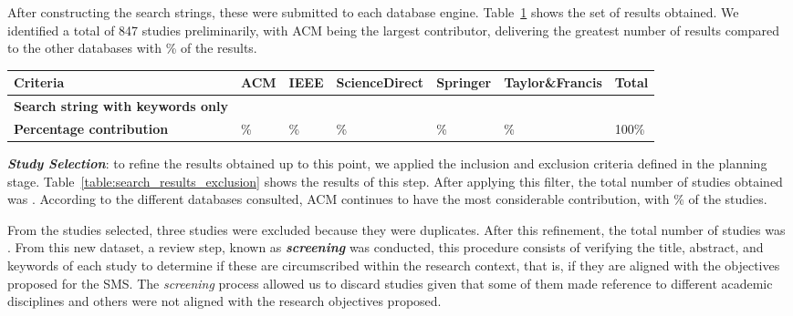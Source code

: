 After constructing the search strings, these were submitted to each database engine. Table~\ref{table:search_results} shows the set of results obtained. We identified a total of 847 studies preliminarily, with ACM being the largest contributor, delivering the greatest number of results compared to the other databases with \acmp\% of the results.

\begin{table}
	{\begin{tabular}{p{3.0cm}p{1.0cm}p{1.0cm}p{2.0cm}p{1.5cm}p{2.5cm}p{1.0cm}} \toprule
			\textbf{Criteria}                         & \textbf{ACM} & \textbf{IEEE} & \textbf{ScienceDirect} & \textbf{Springer} & \textbf{Taylor\&Francis} & \textbf{Total} \\
			\midrule
			\textbf{Search string with keywords only} & \acm{}       & \ieee{}       & \sd{}                  & \spr{}            & \tf{}                    & \tot{}         \\
			\textbf{Percentage contribution}          & \acmp{}\%    & \ieeep{}\%    & \sdp{}\%               & \sprp{}\%         & \tfp{}\%                 & 100\%          \\
			\bottomrule
		\end{tabular}}
	\label{table:search_results}
\end{table}




\textit{\textbf{Study Selection}}: to refine the results obtained up to this point, we applied the inclusion and exclusion criteria defined in the planning stage. Table~\ref{table:search_results_exclusion} shows the results of this step. After applying this filter, the total number of studies obtained was \itot. According to the different databases consulted, ACM continues to have the most considerable contribution, with \iacmp\% of the studies.


From the \itot{} studies selected, three studies were excluded because they were duplicates. After this refinement, the total number of studies was \depTot{}. From this new dataset, a review step, known as \textit{\textbf{screening}} was conducted, this procedure consists of verifying the title, abstract, and keywords of each study to determine if these are circumscribed within the research context, that is, if they are aligned with the objectives proposed for the SMS. The \textit{screening} process allowed us to discard \screen{} studies given that some of them made reference to different academic disciplines and others were not aligned with the research objectives proposed.

